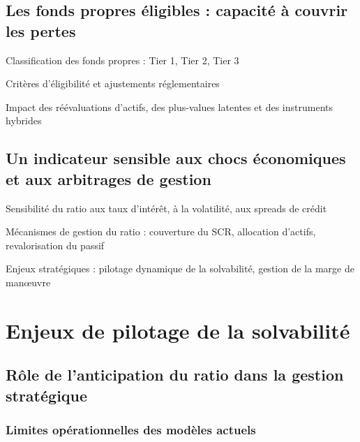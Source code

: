 \subsection{Les fonds propres éligibles : capacité à couvrir les pertes}

Classification des fonds propres : Tier 1, Tier 2, Tier 3

Critères d’éligibilité et ajustements réglementaires

Impact des réévaluations d’actifs, des plus-values latentes et des instruments hybrides

\subsection{Un indicateur sensible aux chocs économiques et aux arbitrages de gestion}

Sensibilité du ratio aux taux d’intérêt, à la volatilité, aux spreads de crédit

Mécanismes de gestion du ratio : couverture du SCR, allocation d’actifs, revalorisation du passif

Enjeux stratégiques : pilotage dynamique de la solvabilité, gestion de la marge de manœuvre

\section{Enjeux de pilotage de la solvabilité}
\label{sec:gse}


\subsection{Rôle de l'anticipation du ratio dans la gestion stratégique}


\subsubsection{Limites opérationnelles des modèles actuels}
